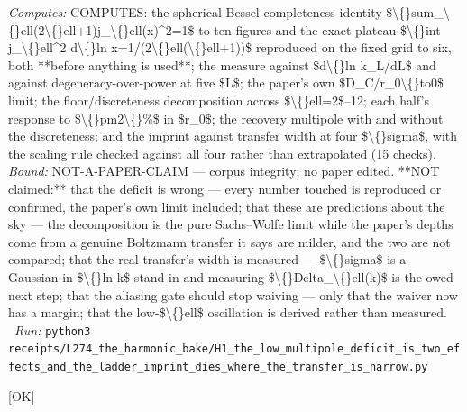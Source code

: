 \begin{description}
\emph{Computes:} COMPUTES: the spherical-Bessel completeness identity \$\textbackslash\{\}sum\_\textbackslash\{\}ell(2\textbackslash\{\}ell+1)j\_\textbackslash\{\}ell(x)\textasciicircum{}2=1\$ to ten figures and the exact plateau \$\textbackslash\{\}int j\_\textbackslash\{\}ell\textasciicircum{}2 d\textbackslash\{\}ln x=1/(2\textbackslash\{\}ell(\textbackslash\{\}ell+1))\$ reproduced on the fixed grid to six, both **before anything is used**; the measure against \$d\textbackslash\{\}ln k\_L/dL\$ and against degeneracy-over-power at five \$L\$; the paper's own \$D\_C/r\_0\textbackslash\{\}to0\$ limit; the floor/discreteness decomposition across \$\textbackslash\{\}ell=2\$--12; each half's response to \$\textbackslash\{\}pm2\textbackslash\{\}\%\$ in \$r\_0\$; the recovery multipole with and without the discreteness; and the imprint against transfer width at four \$\textbackslash\{\}sigma\$, with the scaling rule checked against all four rather than extrapolated (15 checks).
 \emph{Bound:} NOT-A-PAPER-CLAIM --- corpus integrity; no paper edited. **NOT claimed:** that the deficit is wrong --- every number touched is reproduced or confirmed, the paper's own limit included; that these are predictions about the sky --- the decomposition is the pure Sachs--Wolfe limit while the paper's depths come from a genuine Boltzmann transfer it says are milder, and the two are not compared; that the real transfer's width is measured --- \$\textbackslash\{\}sigma\$ is a Gaussian-in-\$\textbackslash\{\}ln k\$ stand-in and measuring \$\textbackslash\{\}Delta\_\textbackslash\{\}ell(k)\$ is the owed next step; that the aliasing gate should stop waiving --- only that the waiver now has a margin; that the low-\$\textbackslash\{\}ell\$ oscillation is derived rather than measured.
\ \emph{Run:} \texttt{python3 receipts/L274\_the\_harmonic\_bake/H1\_the\_low\_multipole\_deficit\_is\_two\_effects\_and\_the\_ladder\_imprint\_dies\_where\_the\_transfer\_is\_narrow.py}
\item[\label{rcpt:U1_the_field_bounces_and_the_corpus_asks_its_self_adjointness_question_at_one_boundary_only}\texttt{U1\_the\_field\_bounces\_and\_the\_corpus\_asks\_its\_self\_adjointness\_question\_at\_one\_boundary\_only}]\hfill\textsf{[OK]}\\

\end{description}

